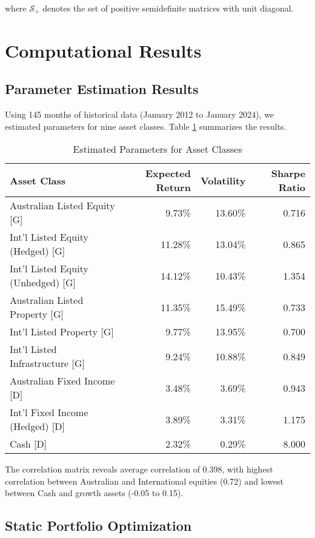 \documentclass[12pt,a4paper]{article}
\begin{document}
where $\mathcal{S}_+$ denotes the set of positive semidefinite matrices with unit diagonal.

\section{Computational Results}

\subsection{Parameter Estimation Results}

Using 145 months of historical data (January 2012 to January 2024), we estimated parameters for nine asset classes. Table \ref{tab:parameters} summarizes the results.

\begin{table}[H]
\centering
\caption{Estimated Parameters for Asset Classes}
\label{tab:parameters}
\begin{tabular}{lrrr}
\toprule
Asset Class & Expected Return & Volatility & Sharpe Ratio \\
\midrule
Australian Listed Equity [G] & 9.73\% & 13.60\% & 0.716 \\
Int'l Listed Equity (Hedged) [G] & 11.28\% & 13.04\% & 0.865 \\
Int'l Listed Equity (Unhedged) [G] & 14.12\% & 10.43\% & 1.354 \\
Australian Listed Property [G] & 11.35\% & 15.49\% & 0.733 \\
Int'l Listed Property [G] & 9.77\% & 13.95\% & 0.700 \\
Int'l Listed Infrastructure [G] & 9.24\% & 10.88\% & 0.849 \\
Australian Fixed Income [D] & 3.48\% & 3.69\% & 0.943 \\
Int'l Fixed Income (Hedged) [D] & 3.89\% & 3.31\% & 1.175 \\
Cash [D] & 2.32\% & 0.29\% & 8.000 \\
\bottomrule
\end{tabular}
\end{table}

The correlation matrix reveals average correlation of 0.398, with highest correlation between Australian and International equities (0.72) and lowest between Cash and growth assets (-0.05 to 0.15).

\subsection{Static Portfolio Optimization}
\end{document}
